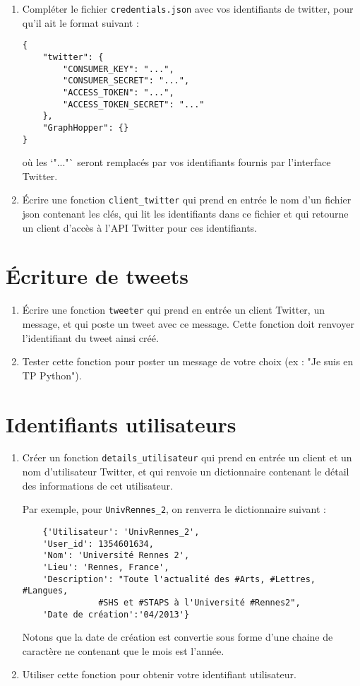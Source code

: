 \documentclass[11pt,a4paper]{article}
\begin{document}
\begin{enumerate}
    \item Compléter le fichier \verb+credentials.json+ avec vos identifiants de twitter, pour qu'il ait le format suivant : 
\begin{verbatim}
{
    "twitter": {
        "CONSUMER_KEY": "...",
        "CONSUMER_SECRET": "...",
        "ACCESS_TOKEN": "...",
        "ACCESS_TOKEN_SECRET": "..."
    },
    "GraphHopper": {}
}

\end{verbatim}
où les `"..."` seront remplacés par vos identifiants fournis par l'interface Twitter.

\item Écrire une fonction \verb+client_twitter+ qui prend en entrée le nom d'un fichier json contenant les clés, qui lit les identifiants dans ce fichier et qui retourne un client d'accès à l'API Twitter pour ces identifiants.
\end{enumerate}




\section{Écriture de tweets}
\begin{enumerate}
    \item Écrire une fonction \verb+tweeter+ qui prend en entrée un client Twitter, un message, et qui poste un tweet avec ce message. 
    Cette fonction doit renvoyer l'identifiant du tweet ainsi créé.
    \item Tester cette fonction pour poster un message de votre choix (ex : "Je suis en TP Python"). 
\end{enumerate}

\section{Identifiants utilisateurs}

\begin{enumerate}

    \item Créer un fonction \verb+details_utilisateur+ qui prend en entrée un client et un nom d'utilisateur Twitter, et qui renvoie un dictionnaire contenant le détail des informations de cet utilisateur. 
    
    Par exemple, pour \verb+UnivRennes_2+, on renverra le dictionnaire suivant : 
    \begin{verbatim}
    {'Utilisateur': 'UnivRennes_2', 
    'User_id': 1354601634, 
    'Nom': 'Université Rennes 2', 
    'Lieu': 'Rennes, France', 
    'Description': "Toute l'actualité des #Arts, #Lettres, #Langues,
               #SHS et #STAPS à l'Université #Rennes2", 
    'Date de création':'04/2013'}
    \end{verbatim}
    Notons que la date de création est convertie sous forme d'une chaine de caractère ne contenant que le mois est l'année.

    \item Utiliser cette fonction pour obtenir votre identifiant utilisateur.

\end{enumerate}
\end{document}
